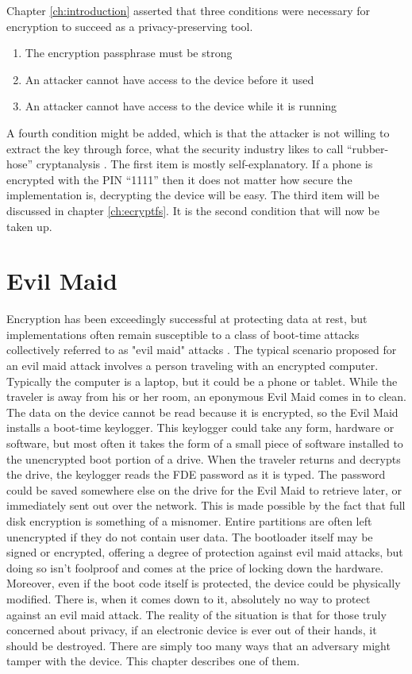 Chapter \ref{ch:introduction} asserted that three conditions were necessary for encryption to succeed as a privacy-preserving tool.
\begin{enumerate}
	\item{The encryption passphrase must be strong}
	\item{An attacker cannot have access to the device before it used}
	\item{An attacker cannot have access to the device while it is running}
\end{enumerate}
A fourth condition might be added, which is that the attacker is not willing to extract the key through force, what the security
industry likes to call ``rubber-hose'' cryptanalysis \cite{rubberhose}.  The first item is mostly self-explanatory. If a phone is
encrypted with the PIN ``1111'' then it does not matter how secure the implementation is, decrypting the device will be easy. The
third item will be discussed in chapter \ref{ch:ecryptfs}.  It is the second condition that will now be taken up. 

\section{Evil Maid}

Encryption has been exceedingly successful at protecting data at rest, but implementations often remain susceptible to a class of boot-time
attacks collectively referred to as "evil maid" attacks \cite{schneiermaid}. The typical scenario proposed for an evil maid attack
involves a person traveling with an encrypted computer. Typically the computer is a laptop, but it could be a phone or tablet.
While the traveler is away from his or her room, an eponymous Evil Maid comes in to clean. The data on the
device cannot be read because it is encrypted, so the Evil Maid installs a boot-time keylogger. This keylogger could take any form,
hardware or software, but most often it takes the form of a small piece of software installed to the unencrypted boot portion of a
drive. When the traveler returns and decrypts the drive, the keylogger reads the FDE password as it is typed. The password could be
saved somewhere else on the drive for the Evil Maid to retrieve later, or immediately sent out over the network.
This is made possible by the fact that full disk encryption is something of a misnomer.  Entire partitions are often left
unencrypted if they do not contain user data.  The bootloader itself may be signed or encrypted, offering a degree of protection
against evil maid attacks, but doing so isn't foolproof \cite{attackingbitlocker} and comes at the price of locking down the
hardware. Moreover, even if the boot code itself is protected, the device could be physically modified. There is, when it comes
down to it, absolutely no way to protect against an evil maid attack.  The reality of the situation is that for those truly
concerned about privacy, if an electronic device is ever out of their hands, it should be destroyed. There are simply too many ways
that an adversary might tamper with the device. This chapter describes one of them.

